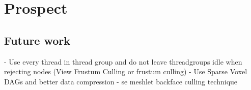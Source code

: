 \chapter{Prospect} \label{cpt-prospect}



\section{Future work}

- Use every thread in thread group and do not leave threadgroups idle when rejecting nodes (View Frustum Culling or frustum culling)
- Use Sparse Voxel DAGs and better data compression
- se meshlet backface culling technique